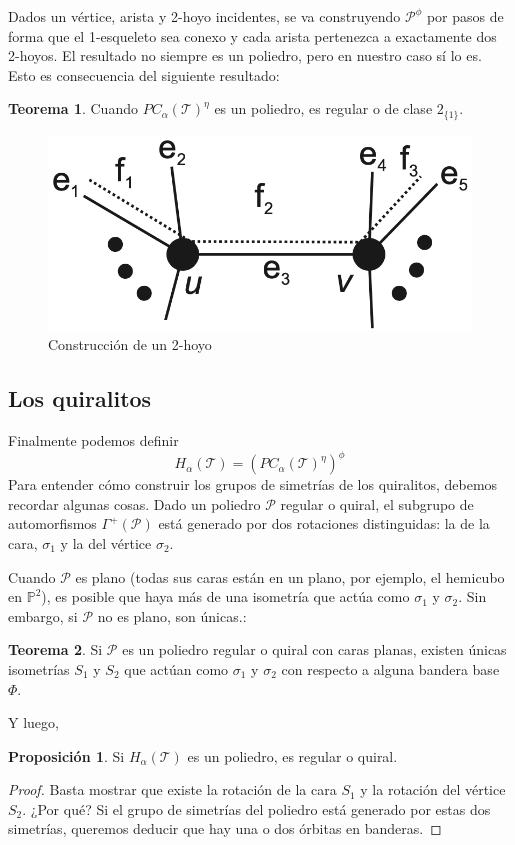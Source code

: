 \documentclass[spanish]{article}
\theoremstyle{definition}
\newtheorem*{teo}{Teorema}
\newtheorem*{prop}{Proposición}
\newcommand{\PP}{\mathbb{P}}
\newcommand{\p}{\mathcal{P}}
\newcommand{\T}{\mathcal{T}}
\begin{document}
	Dados un vértice, arista y 2-hoyo incidentes, se va construyendo $\p^\phi$ por pasos de forma que el 1-esqueleto sea conexo y cada arista pertenezca a exactamente dos 2-hoyos. El resultado no siempre es un poliedro, pero en nuestro caso sí lo es. Esto es consecuencia del siguiente resultado:
	
	\begin{teo}
		Cuando $PC_\alpha(\T)^\eta$ es un poliedro, es regular o de clase $2_{\{1\}}$.
	\end{teo}
	
	\begin{figure}[H]
		\centering
		\includegraphics[width=0.5\linewidth]{p4}
		\caption*{Construcción de un 2-hoyo}
	\end{figure}
	
	\subsection{Los quiralitos}
	Finalmente podemos definir
	\[H_\alpha(\T)=\left(PC_\alpha(\T)^\eta\right)^\phi\]
	Para entender cómo construir los grupos de simetrías de los quiralitos, debemos recordar algunas cosas. Dado un poliedro $\p$ regular o quiral, el subgrupo de automorfismos $\Gamma^+(\p)$ está generado por dos rotaciones distinguidas: la de la cara, $\sigma_1$ y la del vértice $\sigma_2$.
	
	Cuando $\p$ es plano (todas sus caras están en un plano, por ejemplo, el hemicubo en $\PP^2$), es posible que haya más de una isometría que actúa como $\sigma_1$ y $\sigma_2$.  Sin embargo, si $\p$ no es plano, son únicas.:
	\begin{teo}
		Si $\p$ es un poliedro regular o quiral con caras planas, existen únicas isometrías $S_1$ y $S_2$ que actúan como $\sigma_1$ y $\sigma_2$ con respecto a alguna bandera base $\Phi$.
	\end{teo}
	Y luego,
	\begin{prop}
		Si $H_\alpha(\T)$ es un poliedro, es regular o quiral.
	\end{prop}
	\begin{proof}
		Basta mostrar que existe la rotación de la cara $S_1$ y la rotación del vértice $S_2$. ¿Por qué? Si el grupo de simetrías del poliedro está generado por estas dos simetrías, queremos deducir que hay una o dos órbitas en banderas.
	\end{proof}
	
\end{document}
